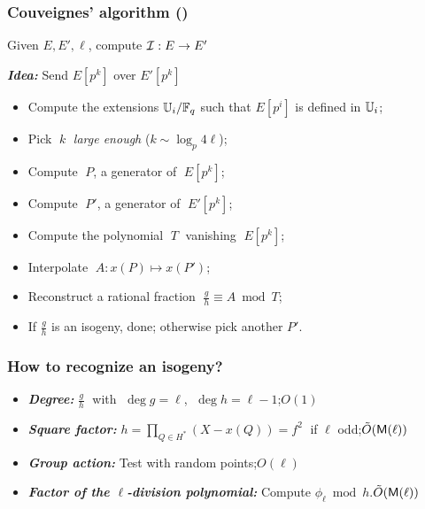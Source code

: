 \documentclass[10pt,usepdftitle=false]{beamer}
\begin{document}
\begin{frame}
  \frametitle{Couveignes' algorithm (\cite{couveignes96})}
  
  \begin{center}
    \large
    Given $E, E', \ell$, compute $\mathcal{I}:E\to E'$
  \end{center}

  \begin{center}
    \emph{\textbf{Idea:}} Send $E[p^k]$ over $E'[p^k]$
  \end{center}
  
  \begin{itemize}
  \item Compute the extensions $\mathbb{U}_i/\mathbb{F}_q$ such that $E[p^i]$ is
    defined in $\mathbb{U}_i$;
  \item Pick $\;k\;$ \emph{large enough} ($k\sim\log_p4\ell$);
  \item Compute $\;P$, a generator of $\;E[p^k]$;
  \item Compute $\;P'$, a generator of $\;E'[p^k]$;
  \item Compute the polynomial $\;T\;$ vanishing $\;E[p^k]$;
  \item Interpolate $\;A : x(P) \mapsto x(P')$;
  \item Reconstruct a rational fraction  $\;\frac{g}{h}\equiv A \bmod T$;
  \item \alert{If $\frac{g}{h}$ is an isogeny}, done; otherwise pick another $P'$.
  \end{itemize}
\end{frame}


\begin{frame}
  \frametitle{How to recognize an isogeny?}

  \begin{itemize}
    \setlength{\itemsep}{\baselineskip}
  \item \emph{\textbf{Degree:}} $\frac{g}{h}\;$ with $\;\deg g=\ell$, $\;\deg h = \ell-1$;\hfill\alert{$O(1)$}
  \item \emph{\textbf{Square factor:}} $h = \prod_{Q\in H^\ast}(X-
    x(Q)) = f^2\;$ if $\ell$ odd;\hfill\emph{$\tilde{O}(\mathsf{M}(\ell))$}
  \item \emph{\textbf{Group action:}} Test with random points;\hfill\emph{$O(\ell)$}
  \item \emph{\textbf{Factor of the $\ell$-division polynomial:}}
    Compute $\phi_\ell\bmod h$.\hfill\emph{$\tilde{O}(\mathsf{M}(\ell))$}
  \end{itemize}
\end{frame}
\end{document}
